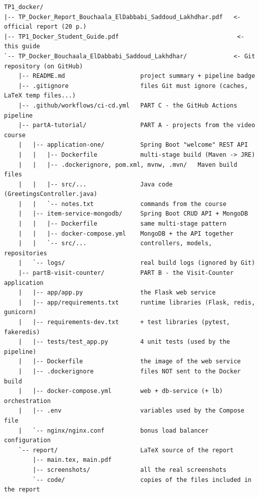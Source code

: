 \documentclass[11pt,a4paper]{article}
\begin{document}
\begin{note}
\scriptsize
\begin{verbatim}
TP1_docker/
|-- TP_Docker_Report_Bouchaala_ElDabbabi_Saddoud_Lakhdhar.pdf   <- official report (20 p.)
|-- TP1_Docker_Student_Guide.pdf                                 <- this guide
`-- TP_Docker_Bouchaala_ElDabbabi_Saddoud_Lakhdhar/             <- Git repository (on GitHub)
    |-- README.md                     project summary + pipeline badge
    |-- .gitignore                    files Git must ignore (caches, LaTeX temp files...)
    |-- .github/workflows/ci-cd.yml   PART C - the GitHub Actions pipeline
    |-- partA-tutorial/               PART A - projects from the video course
    |   |-- application-one/          Spring Boot "welcome" REST API
    |   |   |-- Dockerfile            multi-stage build (Maven -> JRE)
    |   |   |-- .dockerignore, pom.xml, mvnw, .mvn/   Maven build files
    |   |   |-- src/...               Java code (GreetingsController.java)
    |   |   `-- notes.txt             commands from the course
    |   |-- item-service-mongodb/     Spring Boot CRUD API + MongoDB
    |   |   |-- Dockerfile            same multi-stage pattern
    |   |   |-- docker-compose.yml    MongoDB + the API together
    |   |   `-- src/...               controllers, models, repositories
    |   `-- logs/                     real build logs (ignored by Git)
    |-- partB-visit-counter/          PART B - the Visit-Counter application
    |   |-- app/app.py                the Flask web service
    |   |-- app/requirements.txt      runtime libraries (Flask, redis, gunicorn)
    |   |-- requirements-dev.txt      + test libraries (pytest, fakeredis)
    |   |-- tests/test_app.py         4 unit tests (used by the pipeline)
    |   |-- Dockerfile                the image of the web service
    |   |-- .dockerignore             files NOT sent to the Docker build
    |   |-- docker-compose.yml        web + db-service (+ lb) orchestration
    |   |-- .env                      variables used by the Compose file
    |   `-- nginx/nginx.conf          bonus load balancer configuration
    `-- report/                       LaTeX source of the report
        |-- main.tex, main.pdf
        |-- screenshots/              all the real screenshots
        `-- code/                     copies of the files included in the report
\end{verbatim}
\end{note}

\end{document}
